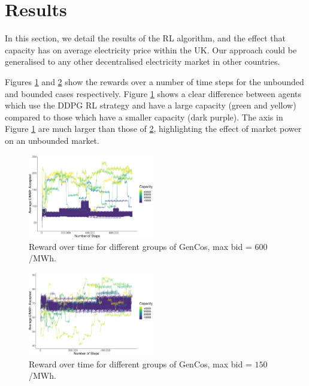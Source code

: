 \documentclass[conference]{IEEEtran}
\providecommand{\DIFaddbeginFL}{} %
\providecommand{\DIFaddendFL}{} %
\providecommand{\DIFdelbeginFL}{} %
\providecommand{\DIFdelendFL}{} %
\newcommand{\DIFscaledelfig}{0.5}
\newlength{\DIFdelgraphicswidth} %
\newlength{\DIFdelgraphicsheight} %
\newcommand{\DIFaddincludegraphics}[2][]{{\color{blue}\fbox{\DIFOincludegraphics[#1]{#2}}}} %
\newcommand{\DIFdelincludegraphics}[2][]{%
\sbox{\DIFdelgraphicsbox}{\DIFOincludegraphics[#1]{#2}}%
\settoboxwidth{\DIFdelgraphicswidth}{\DIFdelgraphicsbox} %
\settoboxtotalheight{\DIFdelgraphicsheight}{\DIFdelgraphicsbox} %
\scalebox{\DIFscaledelfig}{%
\parbox[b]{\DIFdelgraphicswidth}{\usebox{\DIFdelgraphicsbox}\\[-\baselineskip] \rule{\DIFdelgraphicswidth}{0em}}\llap{\resizebox{\DIFdelgraphicswidth}{\DIFdelgraphicsheight}{%
\setlength{\unitlength}{\DIFdelgraphicswidth}%
\begin{picture}(1,1)%
\thicklines\linethickness{2pt} %
{\color[rgb]{1,0,0}\put(0,0){\framebox(1,1){}}}%
{\color[rgb]{1,0,0}\put(0,0){\line( 1,1){1}}}%
{\color[rgb]{1,0,0}\put(0,1){\line(1,-1){1}}}%
\end{picture}%
}\hspace*{3pt}}} %
} %
\DeclareRobustCommand{\DIFaddbeginFL}{\DIFOaddbeginFL \let\includegraphics\DIFaddincludegraphics} %
\DeclareRobustCommand{\DIFaddendFL}{\DIFOaddendFL \let\includegraphics\DIFOincludegraphics} %
\DeclareRobustCommand{\DIFdelbeginFL}{\DIFOdelbeginFL \let\includegraphics\DIFdelincludegraphics} %
\DeclareRobustCommand{\DIFdelendFL}{\DIFOaddendFL \let\includegraphics\DIFOincludegraphics} %
\begin{document}
\section{Results}
\label{sec:results}

In this section, we detail the results of the RL algorithm, and the effect that capacity has on average electricity price within the UK. Our approach could be generalised to any other decentralised electricity market in other countries. 

Figures \ref{fig:unbounded_timesteps} and \ref{fig:bounded_timesteps} show the rewards over a number of time steps for the unbounded and bounded cases respectively. Figure \ref{fig:unbounded_timesteps} shows a clear difference between agents which use the DDPG RL strategy and have a large capacity (green and yellow) compared to those which have a smaller capacity (dark purple). The axis in Figure \ref{fig:unbounded_timesteps} are much larger than those of \ref{fig:bounded_timesteps}, highlighting the effect of market power on an unbounded market.


\begin{figure}
	\centering
    \DIFdelbeginFL %
\DIFdelendFL \DIFaddbeginFL \includegraphics[width=0.49\textwidth]{figures/results/unbounded_results.pdf}
    \DIFaddendFL \caption{Reward over time for different groups of GenCos, max bid = \textsterling $600$/MWh.}
    \label{fig:unbounded_timesteps}
\end{figure}

\begin{figure}
	\centering
    \DIFdelbeginFL %
\DIFdelendFL \DIFaddbeginFL \includegraphics[width=0.49\textwidth]{figures/results/bounded_results.pdf}
    \DIFaddendFL \caption{Reward over time for different groups of GenCos, max bid = \textsterling $150$/MWh.}
    \label{fig:bounded_timesteps}
\end{figure}
\end{document}
